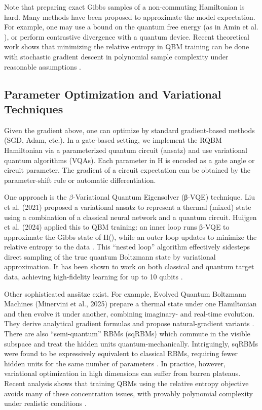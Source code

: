 \documentclass[%
oneside,                 %
final,                   %
10pt]{article}
\begin{document}
Note that preparing exact Gibbs samples of a non-commuting Hamiltonian
is hard.  Many methods have been proposed to approximate the model
expectation.  For example, one may use a bound on the quantum free
energy (as in Amin et al. ), or perform contrastive divergence with a
quantum device.  Recent theoretical work shows that minimizing the
relative entropy in QBM training can be done with stochastic gradient
descent in polynomial sample complexity under reasonable assumptions .

\subsection{Parameter Optimization and Variational Techniques}

Given the gradient above, one can optimize \theta by standard
gradient-based methods (SGD, Adam, etc.).  In a gate-based setting, we
implement the RQBM Hamiltonian via a parameterized quantum circuit
(ansatz) and use variational quantum algorithms (VQAs).  Each
parameter in H is encoded as a gate angle or circuit parameter.  The
gradient of a circuit expectation can be obtained by the
parameter-shift rule or automatic differentiation.

One approach is the $\beta$-Variational Quantum Eigensolver (β-VQE)
technique.  Liu et al. (2021) proposed a variational ansatz to
represent a thermal (mixed) state using a combination of a classical
neural network and a quantum circuit.  Huijgen et al. (2024) applied
this to QBM training: an inner loop runs β-VQE to approximate the
Gibbs state of H(\theta), while an outer loop updates \theta to
minimize the relative entropy to the data .  This “nested loop”
algorithm effectively sidesteps direct sampling of the true quantum
Boltzmann state by variational approximation.  It has been shown to
work on both classical and quantum target data, achieving
high-fidelity learning for up to 10 qubits .

Other sophisticated ansätze exist.  For example, Evolved Quantum
Boltzmann Machines (Minervini et al., 2025) prepare a thermal state
under one Hamiltonian and then evolve it under another, combining
imaginary- and real-time evolution.  They derive analytical gradient
formulas and propose natural-gradient variants .  There are also
“semi-quantum” RBMs (sqRBMs) which commute in the visible subspace and
treat the hidden units quantum-mechanically.  Intriguingly, sqRBMs
were found to be expressively equivalent to classical RBMs, requiring
fewer hidden units for the same number of parameters . In practice,
however, variational optimization in high dimensions can suffer from
barren plateaus. Recent analysis shows that training QBMs using the
relative entropy objective avoids many of these concentration issues,
with provably polynomial complexity under realistic conditions .
\end{document}
